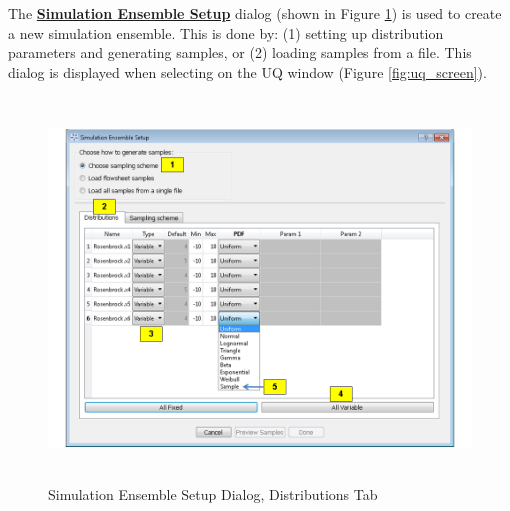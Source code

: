 The \textbf{\underline{Simulation Ensemble Setup}} dialog (shown in Figure \ref{fig:uq_sim_dist}) is used
to create a new simulation ensemble. This is done by: (1) setting up
distribution parameters and generating samples, or (2) loading samples from
a file. This dialog is displayed when selecting  on the UQ
window (Figure \ref{fig:uq_screen}).

\begin{figure}[H]
\centering \includegraphics[width=6.5in,height=4in,keepaspectratio]{Chapt_uq/figs/overview/6_SimSetupDist2}
\caption{Simulation Ensemble Setup Dialog, Distributions Tab}
\label{fig:uq_sim_dist}
\end{figure}

